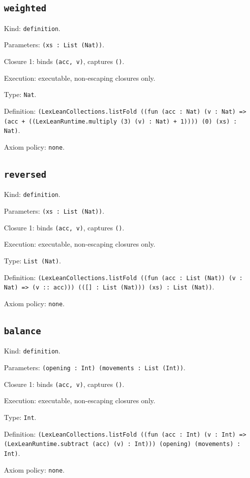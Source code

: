 \documentclass[11pt]{article}
\begin{document}
\subsection*{\texttt{weighted}}
\noindent Kind: \texttt{definition}.\par
\noindent Parameters: \texttt{(xs : List (Nat))}.\par
\noindent Closure 1: binds \texttt{(acc, v)}, captures \texttt{()}.\par
\noindent Execution: executable, non-escaping closures only.\par
\noindent Type: \texttt{Nat}.\par
\noindent Definition: \texttt{(LexLeanCollections.listFold ((fun (acc : Nat) (v : Nat) => (acc + ((LexLeanRuntime.multiply (3) (v) : Nat) + 1)))) (0) (xs) : Nat)}.\par
\noindent Axiom policy: \texttt{none}.\par
\subsection*{\texttt{reversed}}
\noindent Kind: \texttt{definition}.\par
\noindent Parameters: \texttt{(xs : List (Nat))}.\par
\noindent Closure 1: binds \texttt{(acc, v)}, captures \texttt{()}.\par
\noindent Execution: executable, non-escaping closures only.\par
\noindent Type: \texttt{List (Nat)}.\par
\noindent Definition: \texttt{(LexLeanCollections.listFold ((fun (acc : List (Nat)) (v : Nat) => (v :: acc))) (([] : List (Nat))) (xs) : List (Nat))}.\par
\noindent Axiom policy: \texttt{none}.\par
\subsection*{\texttt{balance}}
\noindent Kind: \texttt{definition}.\par
\noindent Parameters: \texttt{(opening : Int) (movements : List (Int))}.\par
\noindent Closure 1: binds \texttt{(acc, v)}, captures \texttt{()}.\par
\noindent Execution: executable, non-escaping closures only.\par
\noindent Type: \texttt{Int}.\par
\noindent Definition: \texttt{(LexLeanCollections.listFold ((fun (acc : Int) (v : Int) => (LexLeanRuntime.subtract (acc) (v) : Int))) (opening) (movements) : Int)}.\par
\noindent Axiom policy: \texttt{none}.\par
\end{document}
